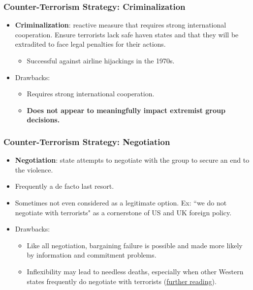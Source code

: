 \documentclass[handout]{beamer}
\begin{document}
\begin{frame} 
	\frametitle{\LARGE{Counter-Terrorism Strategy: Criminalization}}
	\begin{itemize}
		\item \textbf{Criminalization}: reactive measure that requires strong international cooperation. Ensure terrorists lack safe haven states and that they will be extradited to face legal penalties for their actions. \pause 
		\begin{itemize}
			\item Successful against airline hijackings in the 1970s. \pause
		\end{itemize}
		\item Drawbacks:
		\begin{itemize}
			\item Requires strong international cooperation. \pause
			\item \textbf{Does not appear to meaningfully impact extremist group decisions.} 
		\end{itemize}
	\end{itemize}
\end{frame}

\begin{frame} 
	\frametitle{\LARGE{Counter-Terrorism Strategy: Negotiation}}
	\begin{itemize}
		\item \textbf{Negotiation}: state attempts to negotiate with the group to secure an end to the violence.
		\item Frequently a de facto last resort. \pause
		\item Sometimes not even considered as a legitimate option. Ex: ``we do not negotiate with terrorists" as a cornerstone of US and UK foreign policy.
		\item Drawbacks:
		\begin{itemize}
			\item Like all negotiation, bargaining failure is possible and made more likely by information and commitment problems. \pause
			\item Inflexibility may lead to needless deaths, especially when other Western states frequently do negotiate with terrorists (\href{https://www.chathamhouse.org/2022/01/we-do-not-negotiate-terrorists-why}{further reading}).
		\end{itemize}
			
	\end{itemize}
\end{frame}
\end{document}
